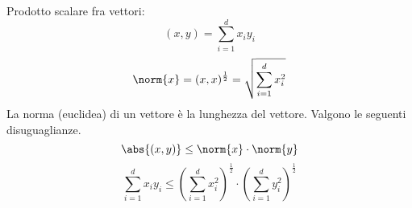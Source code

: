 Prodotto scalare fra vettori:
\[
(x,y) = \sum_{i = 1}^{d} x_i y_i
\]
\[
\norm{x} = (x,x)^{\frac{1}{2}} = \sqrt{\sum_{i = 1}^{d} x_i^2}
\]
La norma (euclidea) di un vettore \`e la lunghezza del vettore. Valgono le seguenti disuguaglianze.
\[
\abs{(x,y)} \le \norm{x} \cdot \norm{y}
\]
\[
\sum_{i = 1}^{d} x_i y_i \le {\left( \sum_{i = 1}^{d} x_i^2 \right)}^{\frac{1}{2}} \cdot {\left( \sum_{i = 1}^{d} y_i^2 \right)}^{\frac{1}{2}}
\]































